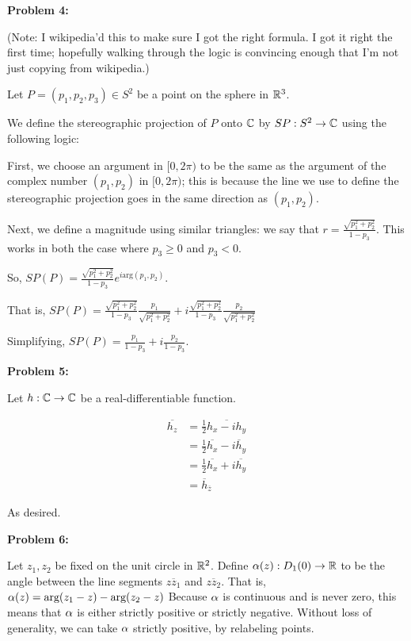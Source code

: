 \documentclass[a4paper,12pt]{article}
\begin{document}
{\bf Problem 4:}

(Note: I wikipedia'd this to make sure I got the right formula. I got it right the first time; hopefully walking through the logic is convincing enough that I'm not just copying from wikipedia.)

Let $P = (p_1,p_2,p_3) \in S^2$ be a point on the sphere in $\mathbb{R}^3$.

We define the stereographic projection of $P$ onto $\mathbb{C}$ by $SP: S^2 \to \mathbb{C}$ using the following logic:

First, we choose an argument in $[0, 2\pi)$ to be the same as the argument of the complex number $(p_1,p_2)$ in $[0,2\pi)$; this is because the line we use to define the stereographic projection goes in the same direction as $(p_1, p_2)$.

\shunt %

Next, we define a magnitude using similar triangles: we say that $r = \frac{\sqrt{p_1^2 + p_2^2}}{1-p_3}$. This works in both the case where $p_3\geq 0$ and $p_3 < 0$.

So, $SP(P) = \frac{\sqrt{p_1^2 + p_2^2}}{1-p_3} e^{i \text{arg}(p_1,p_2)}$.

\shunt %

That is, $SP(P) = \frac{\sqrt{p_1^2 + p_2^2}}{1-p_3} \frac{p_1}{\sqrt{p_1^2+p_2^2}} + i\frac{\sqrt{p_1^2 + p_2^2}}{1-p_3} \frac{p_2}{\sqrt{p_1^2+p_2^2}}$

Simplifying, $SP(P) = \frac{p_1}{1-p_3} + i \frac{p_2}{1-p_3}$.

\shunt

{\bf Problem 5:}

Let $h: \mathbb{C} \to \mathbb{C}$ be a real-differentiable function.

\begin{align*}
\overline{h_z} &= \frac{1}{2} \overline{h_x-ih_y}\\
&= \frac{1}{2} \overline{h_x}-\overline{ih_y}\\
&= \frac{1}{2} \overline{h_x}+i\overline{h_y}\\
&= \overline{h}_{\overline{z}}
\end{align*}

As desired.

\shunt

{\bf Problem 6:}

Let $z_1,z_2$ be fixed on the unit circle in $\mathbb{R}^2$. Define $\alpha(z): D_1(0) \to \mathbb{R}$ to be the angle between the line segments $\overline{zz_1}$ and $\overline{zz_2}$. That is, $\alpha(z) = \text{arg}(z_1-z) - \text{arg}(z_2-z)$ Because $\alpha$ is continuous and is never zero, this means that $\alpha$ is either strictly positive or strictly negative. Without loss of generality, we can take $\alpha$ strictly positive, by relabeling points.
\end{document}
